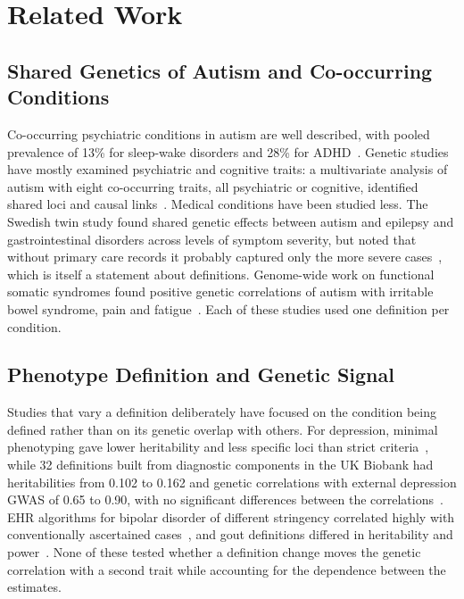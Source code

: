 \documentclass[conference]{IEEEtran}
\begin{document}
\section{Related Work}

\subsection{Shared Genetics of Autism and Co-occurring Conditions}
Co-occurring psychiatric conditions in autism are well described, with pooled prevalence of 13\% for sleep-wake disorders and 28\% for ADHD~\cite{lai2019}. Genetic studies have mostly examined psychiatric and cognitive traits: a multivariate analysis of autism with eight co-occurring traits, all psychiatric or cognitive, identified shared loci and causal links~\cite{salenius2024}. Medical conditions have been studied less. The Swedish twin study found shared genetic effects between autism and epilepsy and gastrointestinal disorders across levels of symptom severity, but noted that without primary care records it probably captured only the more severe cases~\cite{pan2023}, which is itself a statement about definitions. Genome-wide work on functional somatic syndromes found positive genetic correlations of autism with irritable bowel syndrome, pain and fatigue~\cite{li2024}. Each of these studies used one definition per condition.

\subsection{Phenotype Definition and Genetic Signal}
Studies that vary a definition deliberately have focused on the condition being defined rather than on its genetic overlap with others. For depression, minimal phenotyping gave lower heritability and less specific loci than strict criteria~\cite{cai2020}, while 32 definitions built from diagnostic components in the UK Biobank had heritabilities from 0.102 to 0.162 and genetic correlations with external depression GWAS of 0.65 to 0.90, with no significant differences between the correlations~\cite{jermy2021}. EHR algorithms for bipolar disorder of different stringency correlated highly with conventionally ascertained cases~\cite{chen2018}, and gout definitions differed in heritability and power~\cite{cadzow2017}. None of these tested whether a definition change moves the genetic correlation with a second trait while accounting for the dependence between the estimates.
\end{document}
